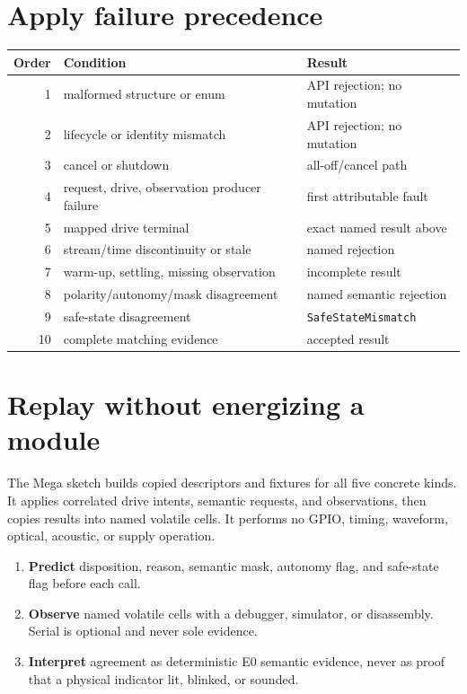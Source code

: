 \documentclass[10pt]{article}
\begin{document}
\section{Apply failure precedence}
\begin{tabularx}{\linewidth}{@{}r l X@{}}
\toprule
Order & Condition & Result\\
\midrule
1 & malformed structure or enum & API rejection; no mutation\\
2 & lifecycle or identity mismatch & API rejection; no mutation\\
3 & cancel or shutdown & all-off/cancel path\\
4 & request, drive, observation producer failure & first attributable fault\\
5 & mapped drive terminal & exact named result above\\
6 & stream/time discontinuity or stale & named rejection\\
7 & warm-up, settling, missing observation & incomplete result\\
8 & polarity/autonomy/mask disagreement & named semantic rejection\\
9 & safe-state disagreement & \texttt{SafeStateMismatch}\\
10 & complete matching evidence & accepted result\\
\bottomrule
\end{tabularx}

\newpage
\section{Replay without energizing a module}
The Mega sketch builds copied descriptors and fixtures for all five concrete
kinds. It applies correlated drive intents, semantic requests, and
observations, then copies results into named volatile cells. It performs no GPIO, timing,
waveform, optical, acoustic, or supply operation.

\begin{enumerate}
 \item \textbf{Predict} disposition, reason, semantic mask, autonomy flag, and
       safe-state flag before each call.
 \item \textbf{Observe} named volatile cells with a debugger, simulator, or
       disassembly. Serial is optional and never sole evidence.
 \item \textbf{Interpret} agreement as deterministic E0 semantic evidence,
       never as proof that a physical indicator lit, blinked, or sounded.
\end{enumerate}
\end{document}

